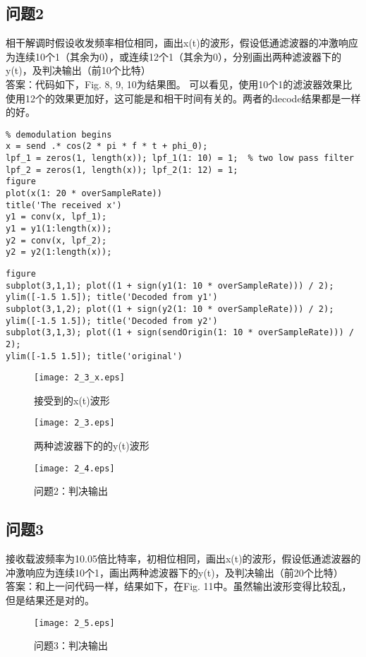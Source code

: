 \documentclass{article}
\begin{document}
\subsection{问题2}相干解调时假设收发频率相位相同，画出x(t)的波形，假设低通滤波器的冲激响应为连续10个1（其余为0），或连续12个1（其余为0），分别画出两种滤波器下的y(t)，及判决输出（前10个比特）\\
答案：代码如下，Fig. 8, 9, 10为结果图。
可以看见，使用10个1的滤波器效果比使用12个的效果更加好，这可能是和相干时间有关的。两者的decode结果都是一样的好。
\begin{lstlisting}
% demodulation begins
x = send .* cos(2 * pi * f * t + phi_0);
lpf_1 = zeros(1, length(x)); lpf_1(1: 10) = 1;  % two low pass filter
lpf_2 = zeros(1, length(x)); lpf_2(1: 12) = 1;
figure
plot(x(1: 20 * overSampleRate))
title('The received x')
y1 = conv(x, lpf_1);
y1 = y1(1:length(x));
y2 = conv(x, lpf_2);
y2 = y2(1:length(x));
\end{lstlisting}
\begin{lstlisting}
figure
subplot(3,1,1); plot((1 + sign(y1(1: 10 * overSampleRate))) / 2);
ylim([-1.5 1.5]); title('Decoded from y1')
subplot(3,1,2); plot((1 + sign(y2(1: 10 * overSampleRate))) / 2);
ylim([-1.5 1.5]); title('Decoded from y2')
subplot(3,1,3); plot((1 + sign(sendOrigin(1: 10 * overSampleRate))) / 2);
ylim([-1.5 1.5]); title('original')
\end{lstlisting}
\begin{figure}[!h]
\begin{center}
		\texttt{[image: 2\_3\_x.eps]}
		\caption{接受到的x(t)波形}
\end{center}
\end{figure}
\begin{figure}[!h]
\begin{center}
		\texttt{[image: 2\_3.eps]}
		\caption{两种滤波器下的的y(t)波形}
\end{center}
\end{figure}
\begin{figure}[!h]
\begin{center}
		\texttt{[image: 2\_4.eps]}
		\caption{问题2：判决输出}
\end{center}
\end{figure}
\subsection{问题3}接收载波频率为10.05倍比特率，初相位相同，画出x(t)的波形，假设低通滤波器的冲激响应为连续10个1，画出两种滤波器下的y(t)，及判决输出（前20个比特）\\
答案：和上一问代码一样，结果如下，在Fig. 11中。虽然输出波形变得比较乱，但是结果还是对的。
\begin{figure}[!h]
\begin{center}
		\texttt{[image: 2\_5.eps]}
		\caption{问题3：判决输出}
\end{center}
\end{figure}
\newpage
\end{document}
